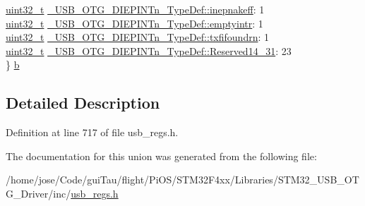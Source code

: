 \begin{DoxyCompactItemize}
\begin{tabbing}
\>\hyperlink{stdint_8h_a435d1572bf3f880d55459d9805097f62}{uint32\_t} \hyperlink{group___u_s_b___o_t_g___d_r_i_v_e_r_ga690132de792f85a88564f1792fee3765}{\_USB\_OTG\_DIEPINTn\_TypeDef::inepnakeff}: 1\\
\>\hyperlink{stdint_8h_a435d1572bf3f880d55459d9805097f62}{uint32\_t} \hyperlink{group___u_s_b___o_t_g___d_r_i_v_e_r_ga32d321f361625ca872c69633ba8d7147}{\_USB\_OTG\_DIEPINTn\_TypeDef::emptyintr}: 1\\
\>\hyperlink{stdint_8h_a435d1572bf3f880d55459d9805097f62}{uint32\_t} \hyperlink{group___u_s_b___o_t_g___d_r_i_v_e_r_ga158dce0a9dd3a9f996d4f1dc5e498c07}{\_USB\_OTG\_DIEPINTn\_TypeDef::txfifoundrn}: 1\\
\>\hyperlink{stdint_8h_a435d1572bf3f880d55459d9805097f62}{uint32\_t} \hyperlink{group___u_s_b___o_t_g___d_r_i_v_e_r_gaa80385fefe8695d6ae753cfceb278786}{\_USB\_OTG\_DIEPINTn\_TypeDef::Reserved14\_31}: 23\\
\} \hyperlink{group___u_s_b___o_t_g___d_r_i_v_e_r_ga4bc8be4b067f5eff9cf4101acef38798}{b}\\

\end{tabbing}\end{DoxyCompactItemize}


\subsection{Detailed Description}


Definition at line 717 of file usb\-\_\-regs.\-h.



The documentation for this union was generated from the following file\-:\begin{DoxyCompactItemize}
\item 
/home/jose/\-Code/gui\-Tau/flight/\-Pi\-O\-S/\-S\-T\-M32\-F4xx/\-Libraries/\-S\-T\-M32\-\_\-\-U\-S\-B\-\_\-\-O\-T\-G\-\_\-\-Driver/inc/\hyperlink{_s_t_m32_f4xx_2_libraries_2_s_t_m32___u_s_b___o_t_g___driver_2inc_2usb__regs_8h}{usb\-\_\-regs.\-h}\end{DoxyCompactItemize}
